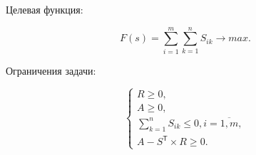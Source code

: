 Целевая функция:

\begin{equation}
	F(s) = \sum_{i = 1}^{m} \sum_{k = 1}^{n} S_{ik} \rightarrow max.
\end{equation}

Ограничения задачи:

\begin{equation}
	\begin{cases}
		R \ge 0,
		\\
		A \ge 0,
		\\
		\sum_{k = 1}^{n} S_{ik} \le 0, i = \overline{1, m},
		\\
		A - S^\mathsf{T} \times R \ge 0.
	\end{cases}
\end{equation}